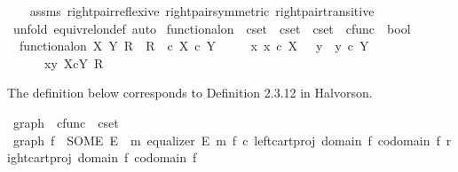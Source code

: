 \begin{isabellebody}
%
\isadelimproof
\ \ %
\endisadelimproof
%
\isatagproof
{}\isamarkupfalse%
\ assms\ right{\isacharunderscore}{\kern0pt}pair{\isacharunderscore}{\kern0pt}reflexive\ right{\isacharunderscore}{\kern0pt}pair{\isacharunderscore}{\kern0pt}symmetric\ right{\isacharunderscore}{\kern0pt}pair{\isacharunderscore}{\kern0pt}transitive\isanewline
\ \ \isamarkupfalse%
\ {\isacharparenleft}{\kern0pt}unfold\ equiv{\isacharunderscore}{\kern0pt}rel{\isacharunderscore}{\kern0pt}on{\isacharunderscore}{\kern0pt}def{\isacharcomma}{\kern0pt}\ auto{\isacharparenright}{\kern0pt}%
\endisatagproof
{\isafoldproof}%
%
\isadelimproof
%
\endisadelimproof
%
\isadelimdocument
%
\endisadelimdocument
%
\isatagdocument
%
\isamarkuptrue%
%
\endisatagdocument
{\isafolddocument}%
%
\isadelimdocument
%
\endisadelimdocument
{}\isamarkupfalse%
\ functional{\isacharunderscore}{\kern0pt}on\ {\isacharcolon}{\kern0pt}{\isacharcolon}{\kern0pt}\ {\isachardoublequoteopen}cset\ {\isasymRightarrow}\ cset\ {\isasymRightarrow}\ cset\ {\isasymtimes}\ cfunc\ {\isasymRightarrow}\ bool{\isachardoublequoteclose}\ \isanewline
\ \ {\isachardoublequoteopen}functional{\isacharunderscore}{\kern0pt}on\ X\ Y\ R\ {\isacharequal}{\kern0pt}\ {\isacharparenleft}{\kern0pt}R\ \ {\isasymsubseteq}\isactrlsub c\ X\ {\isasymtimes}\isactrlsub c\ Y\ {\isasymand}\isanewline
\ \ \ \ {\isacharparenleft}{\kern0pt}{\isasymforall}x{\isachardot}{\kern0pt}\ x\ {\isasymin}\isactrlsub c\ X\ {\isasymlongrightarrow}\ {\isacharparenleft}{\kern0pt}{\isasymexists}{\isacharbang}{\kern0pt}\ y{\isachardot}{\kern0pt}\ \ y\ {\isasymin}\isactrlsub c\ Y\ {\isasymand}\ \ \isanewline
\ \ \ \ \ \ {\isasymlangle}x{\isacharcomma}{\kern0pt}y{\isasymrangle}\ {\isasymin}\isactrlbsub X{\isasymtimes}\isactrlsub cY\isactrlesub \ R{\isacharparenright}{\kern0pt}{\isacharparenright}{\kern0pt}{\isacharparenright}{\kern0pt}{\isachardoublequoteclose}%
\begin{isamarkuptext}%
The definition below corresponds to Definition 2.3.12 in Halvorson.%
\end{isamarkuptext}\isamarkuptrue%
\isamarkupfalse%
\ graph\ {\isacharcolon}{\kern0pt}{\isacharcolon}{\kern0pt}\ {\isachardoublequoteopen}cfunc\ {\isasymRightarrow}\ cset{\isachardoublequoteclose}\ \isanewline
\ {\isachardoublequoteopen}graph\ f\ {\isacharequal}{\kern0pt}\ {\isacharparenleft}{\kern0pt}SOME\ E{\isachardot}{\kern0pt}\ {\isasymexists}\ m{\isachardot}{\kern0pt}\ equalizer\ E\ m\ {\isacharparenleft}{\kern0pt}f\ {\isasymcirc}\isactrlsub c\ left{\isacharunderscore}{\kern0pt}cart{\isacharunderscore}{\kern0pt}proj\ {\isacharparenleft}{\kern0pt}domain\ f{\isacharparenright}{\kern0pt}\ {\isacharparenleft}{\kern0pt}codomain\ f{\isacharparenright}{\kern0pt}{\isacharparenright}{\kern0pt}\ {\isacharparenleft}{\kern0pt}right{\isacharunderscore}{\kern0pt}cart{\isacharunderscore}{\kern0pt}proj\ {\isacharparenleft}{\kern0pt}domain\ f{\isacharparenright}{\kern0pt}\ {\isacharparenleft}{\kern0pt}codomain\ f{\isacharparenright}{\kern0pt}{\isacharparenright}{\kern0pt}{\isacharparenright}{\kern0pt}{\isachardoublequoteclose}\isanewline

\end{isabellebody}
